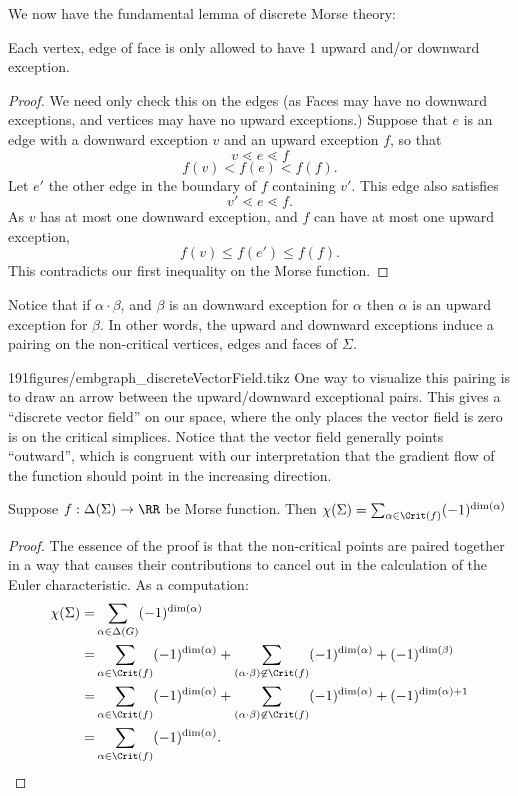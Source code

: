 We now have the fundamental lemma of discrete Morse theory:

\begin{lemma}
Each vertex, edge of face is only allowed to have 1 upward and/or downward exception. 
\end{lemma}
\begin{proof}
	We need only check this on the edges (as Faces may have no downward exceptions, and vertices may have no upward exceptions.)
	Suppose that $e$ is an edge with a downward exception $v$ and an upward exception $f$, so that 
	\[v\lessdot e\lessdot f\]
	\[f(v)< f(e)< f(f).\]
	Let $e'$ the other edge in the boundary of $f$ containing $v'$. This edge also satisfies
	\[v'\lessdot e\lessdot f.\]
	As $v$ has at most one downward exception, and $f$ can have at most one upward exception, 
	\[f(v)\leq f(e') \leq f(f).\]
	This contradicts our first inequality on the Morse function. 
\end{proof}
Notice that if $\alpha\cdot \beta$, and $\beta$ is an downward exception for $\alpha$ then $\alpha$ is an upward exception for $\beta$. In other words, the upward and downward exceptions induce a pairing on the non-critical vertices, edges and faces of $\Sigma$. \\
\begin{examplefigureenv}{191figures/embgraph_discreteVectorField.tikz}
	One way to visualize this pairing is to draw an arrow between the upward/downward exceptional pairs. This gives a ``discrete vector field'' on our space, where the only places the vector field is zero is on the critical simplices. Notice that the vector field generally points ``outward'', which is congruent with our interpretation that the gradient flow of the function should point in the increasing direction. 
\end{examplefigureenv}
\begin{theorem}
	Suppose $f: \Delta(\Sigma) \to \RR$  be Morse function. Then 
	$\chi(\Sigma)= \sum_{\alpha\in \Crit(f)} (-1)^{\dim(\alpha)}$
\end{theorem}
\begin{proof}
The essence of the proof is that the non-critical points are paired together in a way that causes their contributions to cancel out in the calculation of the Euler characteristic. As a computation:
\begin{align*}
\chi(\Sigma)=& \sum_{\alpha\in \Delta(G)}(-1)^{\dim(\alpha)}\\
=&\sum_{\alpha\in \Crit(f)} (-1)^{\dim(\alpha)} + \sum_{(\alpha \cdot \beta)\not\in \Crit(f)} (-1)^{\dim(\alpha)}+(-1)^{\dim(\beta)}\\
=&\sum_{\alpha\in \Crit(f)} (-1)^{\dim(\alpha) }+ \sum_{(\alpha \cdot \beta)\not\in \Crit(f)} (-1)^{\dim(\alpha)}+(-1)^{\dim(\alpha)+1}\\
=&\sum_{\alpha\in \Crit(f)} (-1)^{\dim(\alpha)}.
\end{align*}
\end{proof}



